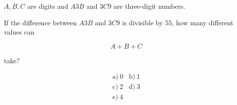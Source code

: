 \(A,B,C\) are digits and \(A3B\) and \(3C9\) are three-digit numbers.



If the difference between \(A3B\) and \(3C9\) is divisible by \(55\), how many different values can



\[
A+B+C
\]

take?



\[
\begin{array}{ll}
\text{a)}\ 0 & \text{b)}\ 1 \\
\text{c)}\ 2 & \text{d)}\ 3 \\
\text{e)}\ 4
\end{array}
\]
